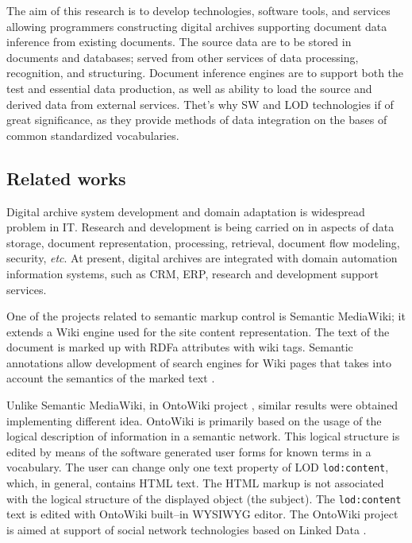\documentclass[conference,a4paper]{IEEEtran}
\begin{document}
The aim of this research is to develop technologies, software tools, and services allowing programmers constructing digital archives supporting document data inference from existing documents.  The source data are to be stored in documents and databases; served from other services of data processing, recognition, and structuring.  Document inference engines are to support both the test and essential data production, as well as ability to load the source and derived data from external services.  Thet's why SW and LOD technologies if of great significance, as they provide methods of data integration on the bases of common standardized vocabularies.

\subsection{Related works}
\label{sec:relwks}

Digital archive system development and domain adaptation is wide\-spre\-ad problem in IT.  Research and development is being carried on in aspects of data storage, document representation, processing, retrieval, document flow modeling, security, \textit{etc}.  At present, digital archives are integrated with domain automation information systems, such as CRM, ERP, research and development support services.

One of the projects related to semantic markup control is Semantic MediaWiki; it extends a Wiki engine used for the site content representation.  The text of the document is marked up with RDFa attributes with wiki tags.  Semantic annotations allow development of search engines for Wiki pages that takes into account the semantics of the marked text \cite{c6}.

Unlike Semantic MediaWiki, in OntoWiki project \cite{b6}, similar results were obtained implementing different idea.  OntoWiki is primarily based on the usage of the logical description of information in a semantic network.  This logical structure is edited by means of the software generated user forms for known terms in a vocabulary.  The user can change only one text property of LOD \texttt{lod:content}, which, in general, contains HTML text.  The HTML markup is not associated with the logical structure of the displayed object (the subject).  The \texttt{lod:content} text is edited with OntoWiki built--in WYSIWYG editor.  The OntoWiki project is aimed at support of social network technologies based on Linked Data \cite{b6}.
\end{document}

